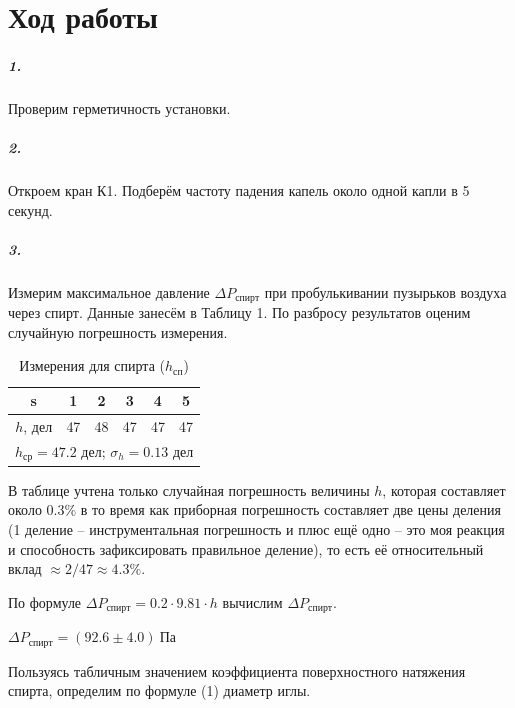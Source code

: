 \documentclass[a4paper,12pt]{article}
\begin{document}
\newpage

\section*{Ход работы}

\subparagraph{1.}Проверим герметичность установки. 

\subparagraph{2.} Откроем кран К1. Подберём частоту падения капель около одной капли в 5 секунд. 


\subparagraph{3.}  Измерим максимальное давление $\Delta P_{спирт}$  при  пробулькивании пузырьков воздуха через спирт. Данные занесём в Таблицу 1. По разбросу результатов оценим случайную погрешность измерения. 


\begin{table}[h!]
\centering
\caption{Измерения для спирта ($h_{сп}$)}
\begin{tabular}{|c|c|c|c|c|c|} \hline
 s& 1& 2 & 3& 4& 5 \\ \hline
 $h$, дел &47 & 48 & 47& 47& 47 \\ \hline
 \multicolumn{6}{|l|}{$h_{ср} = 47.2$ дел; $\sigma_h = 0.13$ дел} \\ \hline
 
\end{tabular}
\end{table}

В таблице учтена только случайная погрешность величины $h$, которая составляет около $0.3\%$  в то время как приборная погрешность составляет две цены деления (1 деление -- инструментальная погрешность и плюс ещё одно -- это моя реакция и способность зафиксировать правильное деление), то есть её относительный вклад $\approx 2 / 47 \approx 4.3\%$.

По формуле $\Delta P_{спирт} = 0.2 \cdot 9.81 \cdot h$ вычислим $\Delta P_{спирт}$.

$\Delta P_{спирт}  = (92.6\pm 4.0)~Па$


Пользуясь табличным значением коэффициента поверхностного натяжения спирта, определим по формуле (1) диаметр иглы. 
\end{document}
